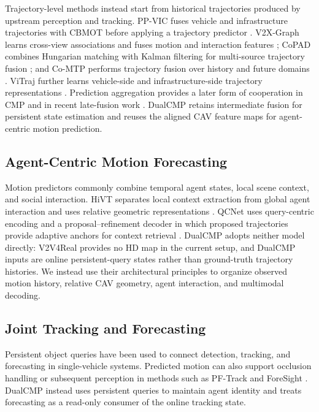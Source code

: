 \documentclass[lettersize,journal]{IEEEtran}
\begin{document}
Trajectory-level methods instead start from historical trajectories produced by upstream perception and tracking. PP-VIC fuses vehicle and infrastructure trajectories with CBMOT before applying a trajectory predictor \cite{yu2023v2xseq}. V2X-Graph learns cross-view associations and fuses motion and interaction features \cite{ruan2024v2xgraph}; CoPAD combines Hungarian matching with Kalman filtering for multi-source trajectory fusion \cite{wu2025copad}; and Co-MTP performs trajectory fusion over history and future domains \cite{zhang2025comtp}. ViTraj further learns vehicle-side and infrastructure-side trajectory representations \cite{you2025vitraj}. Prediction aggregation provides a later form of cooperation in CMP and in recent late-fusion work \cite{wang2025cmp,madjid2026latefusion}. DualCMP retains intermediate fusion for persistent state estimation and reuses the aligned CAV feature maps for agent-centric motion prediction.

\subsection{Agent-Centric Motion Forecasting}

Motion predictors commonly combine temporal agent states, local scene context, and social interaction. HiVT separates local context extraction from global agent interaction and uses relative geometric representations \cite{zhou2022hivt}. QCNet uses query-centric encoding and a proposal--refinement decoder in which proposed trajectories provide adaptive anchors for context retrieval \cite{zhou2023qcnet}. DualCMP adopts neither model directly: V2V4Real provides no HD map in the current setup, and DualCMP inputs are online persistent-query states rather than ground-truth trajectory histories. We instead use their architectural principles to organize observed motion history, relative CAV geometry, agent interaction, and multimodal decoding.

\subsection{Joint Tracking and Forecasting}

Persistent object queries have been used to connect detection, tracking, and forecasting in single-vehicle systems. Predicted motion can also support occlusion handling or subsequent perception in methods such as PF-Track and ForeSight \cite{pang2023pftrack,papais2025foresight}. DualCMP instead uses persistent queries to maintain agent identity and treats forecasting as a read-only consumer of the online tracking state.
\end{document}
